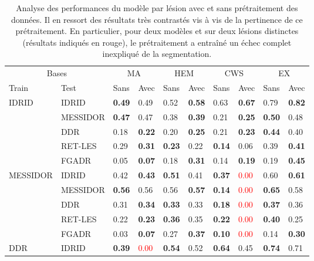\begin{table}[H]
	\caption{Analyse des performances du modèle par lésion avec et sans prétraitement des données. Il en ressort des résultats très contrastés vis à vis de la pertinence de ce prétraitement. En particulier, pour deux modèles et sur deux lésions distinctes (résultats indiqués en rouge), le prétraitement a entraîné un échec complet inexpliqué de la segmentation.}
	\label{tab:analysePerfPretraitement}
	\begin{tabularx}{\textwidth}{XX|ll|ll|ll|ll}
		\toprule
		\multicolumn{2}{c}{Bases} & \multicolumn{2}{c}{MA} & \multicolumn{2}{c}{HEM} & \multicolumn{2}{c}{CWS} & \multicolumn{2}{c}{EX} \\
		Train & Test & Sans & Avec & Sans & Avec & Sans & Avec & Sans & Avec \\
		\midrule
		\multirow{5}{4em}{IDRID} & IDRID & \textbf{0.49} & 0.49 & 0.52 & \textbf{0.58} & 0.63 & \textbf{0.67} & 0.79 & \textbf{0.82} \\
		& MESSIDOR & \textbf{0.47} & 0.47 & 0.38 & \textbf{0.39} & 0.21 & \textbf{0.25} & \textbf{0.50} & 0.48 \\
		& DDR & 0.18 & \textbf{0.22} & 0.20 & \textbf{0.25} & 0.21 & \textbf{0.23} & \textbf{0.44} & 0.40 \\
		& RET-LES & 0.29 & \textbf{0.31} & \textbf{0.23} & 0.22 & \textbf{0.14} & 0.06 & 0.39 & \textbf{0.41} \\
		& FGADR & 0.05 & \textbf{0.07} & 0.18 & \textbf{0.31} & 0.14 & \textbf{0.19} & 0.19 & \textbf{0.45} \\
		\midrule
		\multirow{5}{4em}{MESSIDOR} & IDRID & 0.42 & \textbf{0.43} & \textbf{0.51} & 0.41 & \textbf{0.37} & \textcolor{red}{0.00} & 0.60 & \textbf{0.61} \\
		& MESSIDOR & \textbf{0.56} & 0.56 & 0.56 & \textbf{0.57} & \textbf{0.14} & \textcolor{red}{0.00} & \textbf{0.65} & 0.58 \\
		& DDR & 0.31 & \textbf{0.34} & \textbf{0.33} & 0.33 & \textbf{0.18} & \textcolor{red}{0.00} & \textbf{0.37} & 0.36 \\
		& RET-LES & 0.22 & \textbf{0.23} & \textbf{0.36} & 0.35 & \textbf{0.22} & \textcolor{red}{0.00} & \textbf{0.40} & 0.25 \\
		& FGADR & 0.03 & \textbf{0.07} & 0.27 & \textbf{0.37} & \textbf{0.10} & \textcolor{red}{0.00} & 0.14 & \textbf{0.30} \\
		\midrule
		\multirow{5}{4em}{DDR} & IDRID & \textbf{0.39} & \textcolor{red}{0.00} & \textbf{0.54} & 0.52 & \textbf{0.64} & 0.45 & \textbf{0.74} & 0.71 \\

\end{tabularx}
\end{table}

